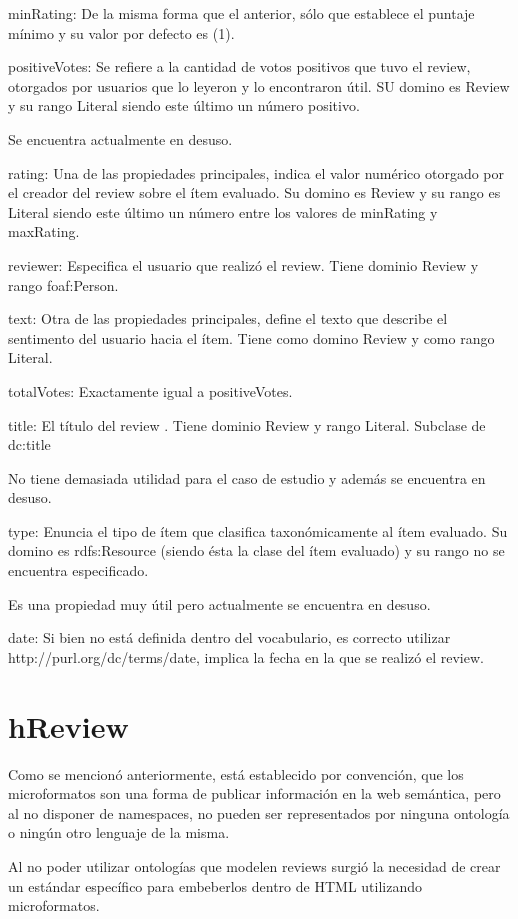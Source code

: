 minRating: De la misma forma que el anterior, sólo que establece el puntaje mínimo y su valor por defecto es (1).


positiveVotes: Se refiere a la cantidad de votos positivos que tuvo el review, otorgados por usuarios que lo leyeron y lo encontraron 
útil. SU domino es Review y su rango Literal siendo este último un número positivo.


Se encuentra actualmente en desuso.


rating: Una de las propiedades principales, indica el valor numérico otorgado por el creador del review sobre el ítem evaluado. 
Su domino es Review y su rango es Literal siendo este último un número entre los valores de minRating y maxRating.


reviewer: Especifica el usuario que realizó el review. Tiene dominio Review y rango foaf:Person. 



text: Otra de las propiedades principales, define el texto que describe el sentimento del usuario hacia el ítem. Tiene como 
domino Review y como rango Literal.


totalVotes: Exactamente igual a positiveVotes.


title: El título del review . Tiene dominio Review y rango Literal. Subclase de dc:title


No tiene demasiada utilidad para el caso de estudio y además se encuentra en desuso.


type: Enuncia el tipo de ítem que clasifica taxonómicamente al ítem evaluado. Su domino es rdfs:Resource (siendo ésta la clase del ítem evaluado)  
y su rango no se encuentra especificado. 


Es una propiedad muy útil pero actualmente se encuentra en desuso.


date: Si bien no está definida dentro del vocabulario, es correcto utilizar http://purl.org/dc/terms/date, implica la fecha en la 
que se realizó el review.


\section{hReview}

Como se mencionó anteriormente, está establecido por convención, que los microformatos son una forma de publicar información en la 
web semántica, pero al no disponer de namespaces, no pueden ser representados por ninguna ontología o ningún otro lenguaje de la misma. 


Al no poder utilizar ontologías que modelen reviews surgió la necesidad de crear un estándar específico para embeberlos dentro de HTML 
utilizando microformatos.

